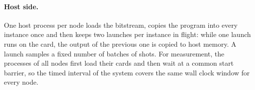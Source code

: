 \paragraph{Host side.} One host process per node loads the bitstream, copies the program into every instance once
and then keeps two launches per instance in flight: while one launch runs on the card, the output of the previous
one is copied to host memory. A launch samples a fixed number of batches of \NumLanes{} shots. For measurement, the
processes of all nodes first load their cards and then wait at a common start barrier, so the timed interval of the
system covers the same wall clock window for every node.
